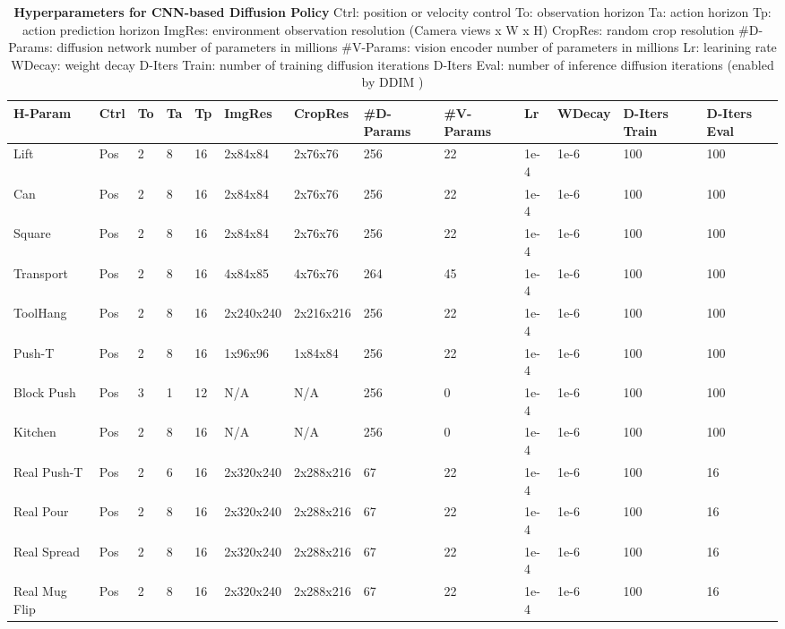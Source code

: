 \documentclass[Afour,sageh,times]{sagej}
\begin{document}
\begin{table}
\centering
\setlength\tabcolsep{3 pt}
\small
\begin{tabular}{l|llllllllllll}
\toprule
\textbf{H-Param} & \textbf{Ctrl} & \textbf{To} & \textbf{Ta} & \textbf{Tp} & \textbf{ImgRes} & \textbf{CropRes} & \textbf{\#D-Params} & \textbf{\#V-Params} & \textbf{Lr} & \textbf{WDecay} & \textbf{D-Iters Train} & \textbf{D-Iters Eval} \\

\midrule
Lift       & Pos  & 2  & 8  & 16 & 2x84x84   & 2x76x76   & 256      & 22       & 1e-4 & 1e-6   & 100           & 100          \\
Can        & Pos  & 2  & 8  & 16 & 2x84x84   & 2x76x76   & 256      & 22       & 1e-4 & 1e-6   & 100           & 100          \\
Square     & Pos  & 2  & 8  & 16 & 2x84x84   & 2x76x76   & 256      & 22       & 1e-4 & 1e-6   & 100           & 100          \\
Transport  & Pos  & 2  & 8  & 16 & 4x84x85   & 4x76x76   & 264      & 45       & 1e-4 & 1e-6   & 100           & 100          \\
ToolHang   & Pos  & 2  & 8  & 16 & 2x240x240 & 2x216x216 & 256      & 22       & 1e-4 & 1e-6   & 100           & 100          \\
Push-T     & Pos  & 2  & 8  & 16 & 1x96x96   & 1x84x84   & 256      & 22       & 1e-4 & 1e-6   & 100           & 100          \\
Block Push & Pos  & 3  & 1  & 12 & N/A       & N/A       & 256      & 0        & 1e-4 & 1e-6   & 100           & 100          \\
Kitchen    & Pos  & 2  & 8  & 16 & N/A       & N/A       & 256      & 0        & 1e-4 & 1e-6   & 100           & 100          \\
\midrule
Real Push-T     & Pos  & 2  & 6  & 16 & 2x320x240 & 2x288x216 & 67       & 22       & 1e-4 & 1e-6   & 100           & 16           \\
Real Pour       & Pos  & 2  & 8  & 16 & 2x320x240 & 2x288x216 & 67       & 22       & 1e-4 & 1e-6   & 100           & 16           \\
Real Spread     & Pos  & 2  & 8  & 16 & 2x320x240 & 2x288x216 & 67       & 22       & 1e-4 & 1e-6   & 100           & 16           \\
Real Mug Flip   & Pos  & 2  & 8  & 16 & 2x320x240 & 2x288x216 & 67       & 22       & 1e-4 & 1e-6   & 100           & 16           \\
\bottomrule
\end{tabular}%
\caption{
\textbf{Hyperparameters for CNN-based Diffusion Policy}
\label{tab:hparam_cnn}
Ctrl: position or velocity control
To: observation horizon
Ta: action horizon
Tp: action prediction horizon
ImgRes: environment observation resolution (Camera views x W x H)
CropRes: random crop resolution
\#D-Params: diffusion network number of parameters in millions
\#V-Params: vision encoder number of parameters in millions
Lr: learining rate
WDecay: weight decay
D-Iters Train: number of training diffusion iterations
D-Iters Eval: number of inference diffusion iterations (enabled by DDIM \cite{song2021ddim})
}


\end{table}
\end{document}
